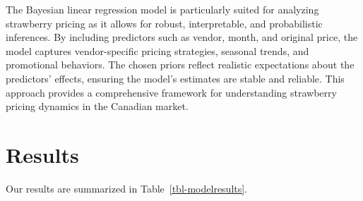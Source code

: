 \documentclass[
  letterpaper,
  DIV=11,
  numbers=noendperiod]{scrartcl}
\begin{document}
The Bayesian linear regression model is particularly suited for
analyzing strawberry pricing as it allows for robust, interpretable, and
probabilistic inferences. By including predictors such as vendor, month,
and original price, the model captures vendor-specific pricing
strategies, seasonal trends, and promotional behaviors. The chosen
priors reflect realistic expectations about the predictors' effects,
ensuring the model's estimates are stable and reliable. This approach
provides a comprehensive framework for understanding strawberry pricing
dynamics in the Canadian market.

\section{Results}\label{sec-result}

Our results are summarized in Table~\ref{tbl-modelresults}.
\end{document}

